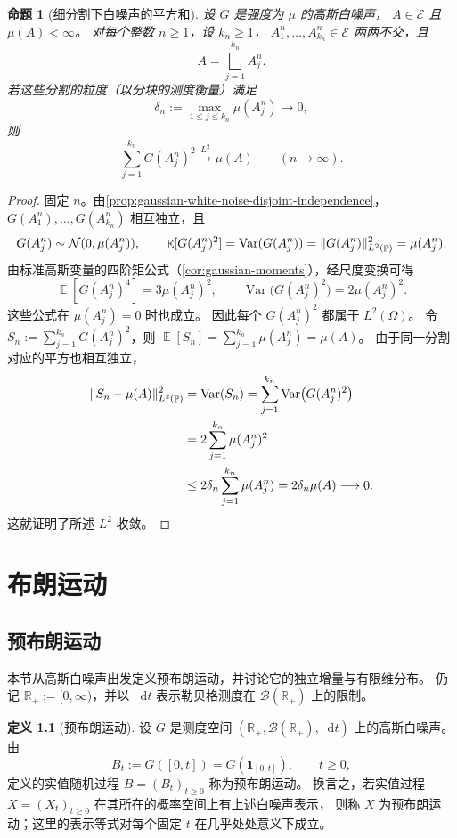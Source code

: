 \documentclass[UTF8,11pt,a4paper,oneside,fontset=fandol]{ctexrep}
\numberwithin{equation}{section}
\theoremstyle{plain}
\newtheorem{proposition}[theorem]{命题}
\theoremstyle{definition}
\newtheorem{definition}[theorem]{定义}
\theoremstyle{remark}
\newcommand{\R}{\mathbb{R}}
\newcommand{\B}{\mathcal{B}}
\DeclareMathOperator{\Prob}{\mathbb{P}}
\DeclareMathOperator{\E}{\mathbb{E}}
\DeclareMathOperator{\Var}{Var}
\newcommand{\ind}[1]{\mathbf{1}_{#1}}
\newcommand{\dd}{\mathop{}\!\mathrm{d}}
\DeclarePairedDelimiter{\norm}{\lVert}{\rVert}
\newcommand{\Lpto}[1]{\xrightarrow{L^{#1}}}
\begin{document}
\begin{proposition}[细分割下白噪声的平方和]
\label{prop:gaussian-white-noise-quadratic-sums}
设 $G$ 是强度为 $\mu$ 的高斯白噪声，
$A\in\mathcal{E}$ 且 $\mu(A)<\infty$。
对每个整数 $n\ge1$，设 $k_n\ge1$，
$A_1^n,\ldots,A_{k_n}^n\in\mathcal{E}$ 两两不交，且
\[
  A=\bigsqcup_{j=1}^{k_n}A_j^n.
\]
若这些分割的粒度（以分块的测度衡量）满足
\[
  \delta_n:=\max_{1\le j\le k_n}\mu(A_j^n)\longrightarrow0,
\]
则
\[
  \sum_{j=1}^{k_n}G(A_j^n)^2\Lpto{2}\mu(A)
  \qquad(n\to\infty).
\]
\end{proposition}

\begin{proof}
固定 $n$。由\cref{prop:gaussian-white-noise-disjoint-independence}，
$G(A_1^n),\ldots,G(A_{k_n}^n)$ 相互独立，且
\[
  G(A_j^n)\sim\mathcal{N}(0,\mu(A_j^n)),\qquad
  \E[G(A_j^n)^2]
  =\Var(G(A_j^n))
  =\norm{G(A_j^n)}_{L^2(\Prob)}^2
  =\mu(A_j^n).
\]
由标准高斯变量的四阶矩公式（\cref{cor:gaussian-moments}），经尺度变换可得
\[
  \E[G(A_j^n)^4]=3\mu(A_j^n)^2,
  \qquad
  \Var\bigl(G(A_j^n)^2\bigr)=2\mu(A_j^n)^2.
\]
这些公式在 $\mu(A_j^n)=0$ 时也成立。
因此每个 $G(A_j^n)^2$ 都属于 $L^2(\Omega)$。
令 $S_n:=\sum_{j=1}^{k_n}G(A_j^n)^2$，则
$\E[S_n]=\sum_{j=1}^{k_n}\mu(A_j^n)=\mu(A)$。
由于同一分割对应的平方也相互独立，
\begin{align*}
  \norm{S_n-\mu(A)}_{L^2(\Prob)}^2
  &=\Var(S_n)
   =\sum_{j=1}^{k_n}\Var\bigl(G(A_j^n)^2\bigr)\\
  &=2\sum_{j=1}^{k_n}\mu(A_j^n)^2\\
  &\le2\delta_n\sum_{j=1}^{k_n}\mu(A_j^n)
   =2\delta_n\mu(A)\longrightarrow0.
\end{align*}
这就证明了所述 $L^2$ 收敛。
\end{proof}

\chapter{布朗运动}
\label{chap:brownian-motion}
\section{预布朗运动}
\label{sec:pre-brownian-motion}

本节从高斯白噪声出发定义预布朗运动，并讨论它的独立增量与有限维分布。
仍记 $\R_+:=[0,\infty)$，并以 $\dd t$ 表示勒贝格测度在
$\B(\R_+)$ 上的限制。

\begin{definition}[预布朗运动]
\label{def:pre-brownian-motion}
设 $G$ 是测度空间 $(\R_+,\B(\R_+),\dd t)$ 上的高斯白噪声。
由
\[
  B_t:=G([0,t])=G(\ind{[0,t]}),\qquad t\ge0,
\]
定义的实值随机过程 $B=(B_t)_{t\ge0}$ 称为预布朗运动。
换言之，若实值过程 $X=(X_t)_{t\ge0}$ 在其所在的概率空间上有上述白噪声表示，
则称 $X$ 为预布朗运动；这里的表示等式对每个固定 $t$ 在几乎处处意义下成立。
\end{definition}
\end{document}
